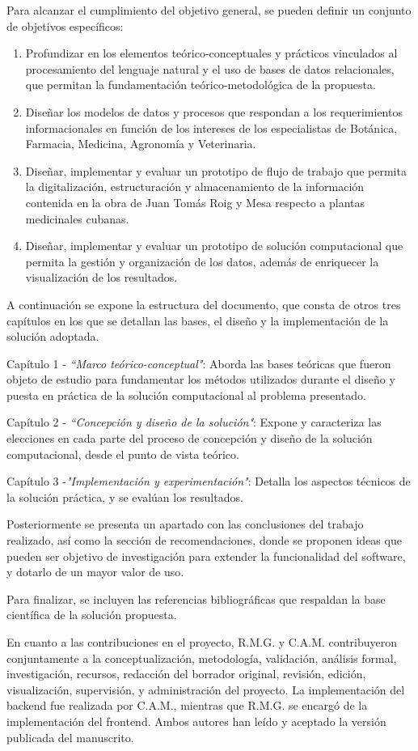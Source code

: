 Para alcanzar el cumplimiento del objetivo general, se pueden 
definir un conjunto de objetivos específicos:
\begin{enumerate}
    \item Profundizar en los elementos teórico-conceptuales y prácticos vinculados al 
    procesamiento del lenguaje natural y el uso de bases de datos relacionales, que permitan 
    la fundamentación teórico-metodológica de la propuesta.
    \item Diseñar los modelos de datos y procesos que respondan a los requerimientos 
    informacionales en función de los intereses de los especialistas de Botánica, 
    Farmacia, Medicina, Agronomía y Veterinaria.
    \item Diseñar, implementar y evaluar un prototipo de flujo de trabajo que permita 
    la digitalización, estructuración y almacenamiento de la información contenida 
    en la obra de Juan Tomás Roig y Mesa respecto a plantas medicinales cubanas.
    \item Diseñar, implementar y evaluar un prototipo de solución computacional que 
    permita la gestión y organización de los datos, además de enriquecer la visualización 
    de los resultados.
\end{enumerate}

A continuación se expone la estructura del documento, que consta de otros tres capítulos 
en los que se detallan las bases, el diseño y la implementación de la solución adoptada.

Capítulo 1 - \textit{``Marco teórico-conceptual"}: Aborda las bases teóricas que fueron 
objeto de estudio para fundamentar los métodos utilizados durante el diseño y puesta en 
práctica de la solución computacional al problema presentado.

Capítulo 2 - \textit{``Concepción y diseño de la solución"}: Expone y caracteriza las 
elecciones en cada parte del proceso de concepción y diseño de la solución computacional, 
desde el punto de vista teórico.

Capítulo 3 -\textit{"Implementación y experimentación"}: Detalla los aspectos técnicos 
de la solución práctica, y se evalúan los resultados.

Posteriormente se presenta un apartado con las conclusiones del trabajo realizado, 
así como la sección de recomendaciones, donde se proponen ideas que pueden ser objetivo 
de investigación para extender la funcionalidad del software, y dotarlo de un mayor 
valor de uso.

Para finalizar, se incluyen las referencias bibliográficas que respaldan la base 
científica de la solución propuesta.

En cuanto a las contribuciones en el proyecto, R.M.G. y C.A.M. contribuyeron conjuntamente 
a la conceptualización, metodología, validación, análisis formal, investigación, recursos, 
redacción del borrador original, revisión, edición, visualización, supervisión, 
y administración del proyecto. La implementación del backend fue realizada por C.A.M., 
mientras que R.M.G. se encargó de la implementación del frontend. Ambos autores han leído 
y aceptado la versión publicada del manuscrito.
